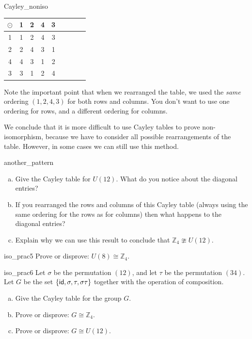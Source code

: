 \begin{example}{Cayley_noniso}
\begin{table}[H]
{\small
\begin{center}
\begin{tabular}{c|cccccccc}
$\odot$ & 1 & 2 & 4 & 3  \\
\hline
1        & 1 & 2 & 4 & 3  \\
2       & 2 & 4 & 3 & 1  \\
4       & 4 & 3 & 1 & 2 \\
3       & 3 & 1 & 2 & 4 \\

\end{tabular}
\end{center}
}
\end{table}

Note the important point that when we rearranged the table, we used the \emph{same} ordering $(1,2,4,3)$ for both rows and columns.   You don't want to use one ordering for rows, and a different ordering for columns.
\end{example} 
We conclude that it is more difficult to use Cayley tables to prove non-isomorphism, because we have to consider all possible rearrangements of the table. However, in some cases we can still use this method.

\begin{exercise}{another_pattern}
\begin{enumerate}[(a)]
\item
Give the Cayley table for $U(12)$. What do you notice about the diagonal entries?
\item
If you rearranged the rows and columns of this Cayley table (always using the same ordering for the rows as for columns) then what happens to the diagonal entries?
\item
Explain why we can use this result to conclude that ${\mathbb Z}_4 \ncong U(12)$.
\end{enumerate}
\end{exercise} 

\begin{exercise}{iso_prac5}
Prove or disprove: $U(8) \cong {\mathbb Z}_4$.
\end{exercise}
  
\begin{exercise}{iso_prac6}
Let $\sigma$ be the permutation $(12)$, and let $\tau$ be the permutation $(34)$.
Let $G$ be the set $\{ \sf{id}, \sigma, \tau, \sigma\tau \}$ together with the operation of composition.
\begin{enumerate}[(a)]
\item
Give the Cayley table for the group $G$.
\item
Prove or disprove: $G \cong {\mathbb Z}_4$.
\item
Prove or disprove: $G \cong U(12)$.
\end{enumerate}
\end{exercise}



